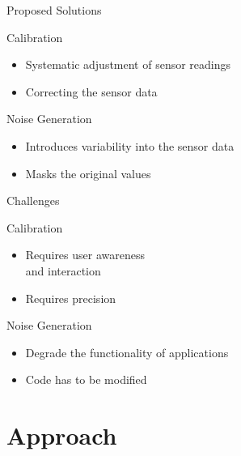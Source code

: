 \documentclass[aspectratio=169]{beamer}
[aspectratio=169] %
\begin{document}
\begin{frame}{Proposed Solutions}
  \begin{minipage}{0.49\textwidth} 
    Calibration
    \begin{itemize}
      \item Systematic adjustment of sensor readings
      \item Correcting the sensor data
    \end{itemize}
  \end{minipage}
  \hfill
  \begin{minipage}{0.49\textwidth} 
    Noise Generation
    \begin{itemize}
      \item Introduces variability into the sensor data
      \item Masks the original values
    \end{itemize}
  \end{minipage}
\end{frame}

\begin{frame}{Challenges}
  \begin{minipage}{0.49\textwidth} 
    Calibration
    \begin{itemize}
      \item Requires user awareness\\and interaction
      \item Requires precision
    \end{itemize}
  \end{minipage}
  \hfill
  \begin{minipage}{0.49\textwidth} 
    Noise Generation
    \begin{itemize}
      \item Degrade the functionality of applications
      \item Code has to be modified
    \end{itemize}
  \end{minipage}
\end{frame}


\section{Approach}
\end{document}
